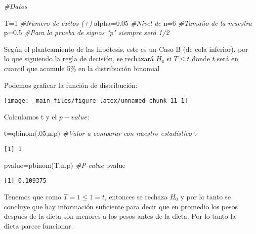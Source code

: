 \documentclass[
  a4paper,
  oneside,
  openany]{book}
\newenvironment{Shaded}{\begin{snugshade}}{\end{snugshade}}
\newcommand{\CommentTok}[1]{\textcolor[rgb]{0.56,0.35,0.01}{\textit{#1}}}
\newcommand{\DecValTok}[1]{\textcolor[rgb]{0.00,0.00,0.81}{#1}}
\newcommand{\FloatTok}[1]{\textcolor[rgb]{0.00,0.00,0.81}{#1}}
\newcommand{\FunctionTok}[1]{\textcolor[rgb]{0.00,0.00,0.00}{#1}}
\newcommand{\NormalTok}[1]{#1}
\newcommand{\OtherTok}[1]{\textcolor[rgb]{0.56,0.35,0.01}{#1}}
\begin{document}
\begin{Shaded}
\begin{Highlighting}[]
\CommentTok{\#Datos}

\NormalTok{T}\OtherTok{=}\DecValTok{1}              \CommentTok{\#Número de éxitos (+)}
\NormalTok{alpha}\OtherTok{=}\FloatTok{0.05}       \CommentTok{\#Nivel de }
\NormalTok{n}\OtherTok{=}\DecValTok{6}              \CommentTok{\#Tamaño de la muestra }
\NormalTok{p}\OtherTok{=}\FloatTok{0.5}            \CommentTok{\#Para la prueba de signos "p" siempre será 1/2}
\end{Highlighting}
\end{Shaded}

Según el planteamiento de las hipótesis, este es un Caso B (de cola inferior), por lo que siguiendo la regla de decisión, se rechazará \(H_0\) si \(T\leq t\) donde \(t\) será en cuantil que acumule 5\% en la distribución binomial

Podemos graficar la función de distribución:

\begin{center}\texttt{[image: \_main\_files/figure-latex/unnamed-chunk-11-1]} \end{center}

Calculamos t y el \(p-value\):

\begin{Shaded}
\begin{Highlighting}[]
\NormalTok{t}\OtherTok{=}\FunctionTok{qbinom}\NormalTok{(.}\DecValTok{05}\NormalTok{,n,p)         }\CommentTok{\#Valor a comparar con nuestro estadístico}
\NormalTok{t}
\end{Highlighting}
\end{Shaded}

\begin{verbatim}
[1] 1
\end{verbatim}

\begin{Shaded}
\begin{Highlighting}[]
\NormalTok{pvalue}\OtherTok{=}\FunctionTok{pbinom}\NormalTok{(T,n,p)       }\CommentTok{\#P{-}value}
\NormalTok{pvalue}
\end{Highlighting}
\end{Shaded}

\begin{verbatim}
[1] 0.109375
\end{verbatim}

Tenemos que como \(T=1\leq 1 =t\), entonces se rechaza \(H_0\) y por lo tanto se concluye que hay información suficiente para decir que en promedio los pesos después de la dieta son menores a los pesos antes de la dieta. Por lo tanto la dieta parece funcionar.
\end{document}
